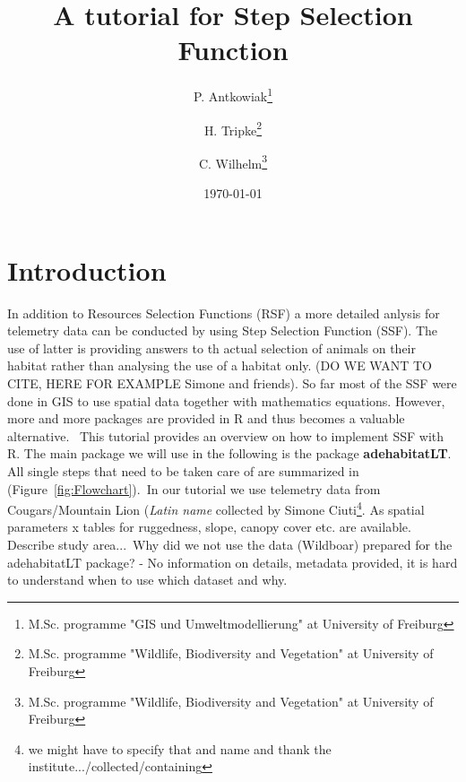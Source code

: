 \documentclass[11pt, a4paper]{article} %
\begin{document}



\title{A tutorial for Step Selection Function}

\author{P. Antkowiak\thanks{M.Sc. programme "GIS und Umweltmodellierung" at University of Freiburg} \and H. Tripke\thanks{M.Sc. programme "Wildlife, Biodiversity and Vegetation" at University of Freiburg} \and C. Wilhelm\thanks{M.Sc. programme "Wildlife, Biodiversity and Vegetation" at University of Freiburg}}

\date{\today} %

\maketitle


\tableofcontents

\newpage

\section{Introduction}%
In addition to Resources Selection Functions (RSF) a more detailed anlysis for telemetry data can be conducted by using Step Selection Function (SSF). The use of latter is providing answers to th actual selection of animals on their habitat rather than analysing the use of a habitat only. (DO WE WANT TO CITE, HERE FOR EXAMPLE Simone and friends). So far most of the SSF were done in GIS to use spatial data together with mathematics equations. However, more and more packages are provided in R and thus becomes a valuable alternative. \
This tutorial provides an overview on how to implement SSF with R. The main package we will use in the following is the package \textbf{adehabitatLT}. All single steps that need to be taken care of are summarized in (Figure~\ref{fig:Flowchart}).\
In our tutorial we use telemetry data from Cougars/Mountain Lion (\textit{Latin name} collected by Simone Ciuti\footnote{we might have to specify that and name and thank the institute.../collected/containing}. As spatial parameters x tables for ruggedness, slope, canopy cover etc. are available. Describe study area...\
Why did we not use the data (Wildboar) prepared for the adehabitatLT package? - No information on details, metadata provided, it is hard to understand when to use which dataset and why.
\end{document}

